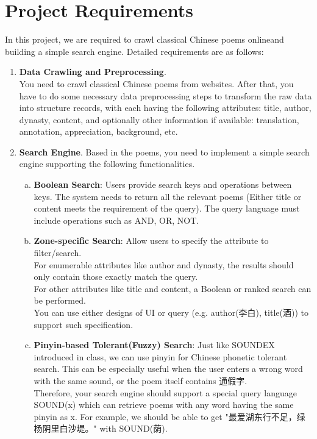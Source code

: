 \section{Project Requirements} \label{sec:intro}

In this project, we are required to crawl classical Chinese poems onlineand building a simple search engine. Detailed requirements are as follows:
\begin{enumerate}
  \item \textbf{Data Crawling and Preprocessing}. \\
      You need to crawl classical Chinese poems from websites. After that, you have to do some necessary data preprocessing steps to transform the raw data into structure records, with each having the following attributes: title, author, dynasty, content, and optionally other information if available: translation, annotation, appreciation, background, etc. 
  \item \textbf{Search Engine}. Based in the poems, you need to implement a simple search engine supporting the following functionalities. 
        \begin{enumerate}[a)]
          \item \textbf{Boolean Search}: Users provide search keys and operations between keys. The system needs to return all the relevant poems (Either title or content meets the requirement of the query). The query language must include operations such as AND, OR, NOT.
          \item \textbf{Zone-specific Search}: Allow users to specify the attribute to filter/search. \\
              For enumerable attributes like author and dynasty, the results should only contain those exactly match the query. \\
              For other attributes like title and content, a Boolean or ranked search can be performed. \\
              You can use either designs of UI or query (e.g. author(李白), title(酒)) to support such specification.
          \item \textbf{Pinyin-based Tolerant(Fuzzy) Search}: Just like SOUNDEX introduced in class, we can use pinyin for Chinese phonetic tolerant search. This can be especially useful when the user enters a wrong word with the same sound, or the poem itself contains 通假字. \\
              Therefore, your search engine should support a special query language SOUND(x) which can retrieve poems with any word having the same pinyin as x. For example, we should be able to get "最爱湖东行不足，绿杨阴里白沙堤。" with SOUND(荫).

\end{enumerate}
\end{enumerate}
